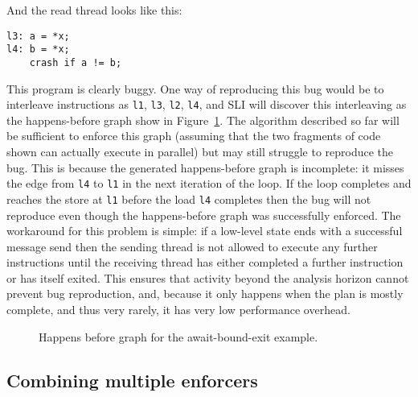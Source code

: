 And the read thread looks like this:

\begin{verbatim}
l3: a = *x;
l4: b = *x;
    crash if a != b;
\end{verbatim}

This program is clearly buggy.  One way of reproducing this bug would
be to interleave instructions as \verb|l1|, \verb|l3|, \verb|l2|,
\verb|l4|, and SLI will discover this interleaving as the
happens-before graph show in Figure~\ref{fig:enforce:await_exit_hb}.
The algorithm described so far will be sufficient to enforce this
graph (assuming that the two fragments of code shown can actually
execute in parallel) but may still struggle to reproduce the bug.
This is because the generated happens-before graph is incomplete: it
misses the edge from \verb|l4| to \verb|l1| in the next iteration of
the loop.  If the loop completes and reaches the store at \verb|l1|
before the load \verb|l4| completes then the bug will not reproduce
even though the happens-before graph was successfully enforced.  The
workaround for this problem is simple: if a low-level state ends with
a successful message send then the sending thread is not allowed to
execute any further instructions until the receiving thread has either
completed a further instruction or has itself exited.  This ensures
that activity beyond the analysis horizon cannot prevent bug
reproduction, and, because it only happens when the plan is mostly
complete, and thus very rarely, it has very low performance overhead.

\begin{figure}
\caption{Happens before graph for the await-bound-exit example.}
\label{fig:enforce:await_exit_hb}
\end{figure}


\subsection{Combining multiple enforcers}
\label{sect:enforce:combine_enforcers}

